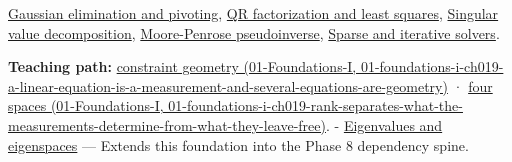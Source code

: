 \hyperref[appendix-f6e77f4a200f]{Gaussian elimination and pivoting}, \hyperref[appendix-c3421e6b4f2c]{QR factorization and least squares}, \hyperref[appendix-1fad5e7f36fa]{Singular value decomposition}, \hyperref[appendix-541306fdbc1b]{Moore-Penrose pseudoinverse}, \hyperref[appendix-67c87a3d9e94]{Sparse and iterative solvers}.

\textbf{Teaching path:} \href{../01-Foundations-I/main.pdf\#nameddest=01-foundations-i-ch019-a-linear-equation-is-a-measurement-and-several-equations-are-geometry}{constraint geometry (01-Foundations-I, 01-foundations-i-ch019-a-linear-equation-is-a-measurement-and-several-equations-are-geometry)} · \href{../01-Foundations-I/main.pdf\#nameddest=01-foundations-i-ch019-rank-separates-what-the-measurements-determine-from-what-they-leave-free}{four spaces (01-Foundations-I, 01-foundations-i-ch019-rank-separates-what-the-measurements-determine-from-what-they-leave-free)}. - \hyperref[appendix-0b3be18411f9]{Eigenvalues and eigenspaces} --- Extends this foundation into the Phase 8 dependency spine.
